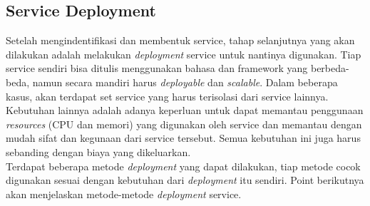 \subsection{Service Deployment}
Setelah mengindentifikasi dan membentuk service, tahap selanjutnya yang akan dilakukan adalah melakukan \textit{deployment} service untuk nantinya digunakan. Tiap service sendiri bisa ditulis menggunakan bahasa dan framework yang berbeda-beda, namun secara mandiri harus \textit{deployable} dan \textit{scalable}. Dalam beberapa kasus, akan terdapat set service yang harus terisolasi dari service lainnya. Kebutuhan lainnya adalah adanya keperluan untuk dapat memantau penggunaan \textit{resources} (CPU dan memori) yang digunakan oleh service dan memantau dengan mudah sifat dan kegunaan dari service tersebut. Semua kebutuhan ini juga harus sebanding dengan biaya yang dikeluarkan.\\
Terdapat beberapa metode \textit{deployment} yang dapat dilakukan, tiap metode cocok digunakan sesuai dengan kebutuhan dari \textit{deployment} itu sendiri. Point berikutnya akan menjelaskan metode-metode \textit{deployment} service.
